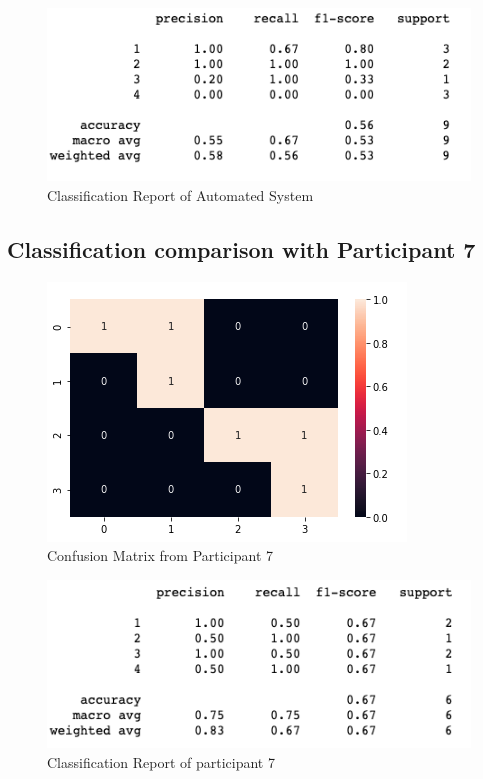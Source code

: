 \begin{figure}[!htp]
    \includegraphics[width=\textwidth]{Images/a6r.png}
    \caption{Classification Report of Automated System}
    \label{fig:f11}
\end{figure}


\pagebreak
\subsection*{Classification comparison with Participant 7}

\begin{figure}[!htp]
    \includegraphics[width=\textwidth]{Images/p7.png}
    \caption{Confusion Matrix from Participant 7}
    \label{fig:f11}
\end{figure}

\begin{figure}[!htp]
    \includegraphics[width=\textwidth]{Images/p7r.png}
    \caption{Classification Report of participant 7}
    \label{fig:f11}
\end{figure}

